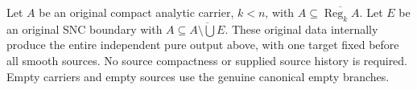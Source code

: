 \begin{theorem}
\label{hir:original-compact-pure-fixed-target-independent-family}
\leanok
Let $A$ be an original compact analytic carrier, $k<n$, with
$A\subseteq\overline{\operatorname{Reg}_k A}$. Let $E$ be an original
SNC boundary with $A\subseteq\overline{A\setminus\bigcup E}$.
These original data internally produce the entire independent pure
output above, with one target fixed before all smooth sources. No
source compactness or supplied source history is required. Empty
carriers and empty sources use the genuine canonical empty branches.
\end{theorem}
